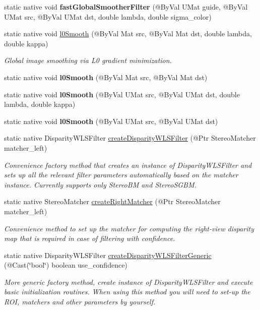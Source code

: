 \begin{DoxyCompactItemize}
static native void {\bfseries fast\+Global\+Smoother\+Filter} (@By\+Val U\+Mat guide, @By\+Val U\+Mat src, @By\+Val U\+Mat dst, double lambda, double sigma\+\_\+color)
\item 
static native void \hyperlink{group__ximgproc__filters_ga5a74b92ad3cd10d7809e4416c623610d}{l0\+Smooth} (@By\+Val Mat src, @By\+Val Mat dst, double lambda, double kappa)
\begin{DoxyCompactList}\small\item\em Global image smoothing via L0 gradient minimization. \end{DoxyCompactList}\item 
static native void {\bfseries l0\+Smooth} (@By\+Val Mat src, @By\+Val Mat dst)
\item 
static native void {\bfseries l0\+Smooth} (@By\+Val U\+Mat src, @By\+Val U\+Mat dst, double lambda, double kappa)
\item 
static native void {\bfseries l0\+Smooth} (@By\+Val U\+Mat src, @By\+Val U\+Mat dst)
\item 
static native Disparity\+W\+L\+S\+Filter \hyperlink{group__ximgproc__filters_ga5282f3f5ccb08ba470cae8c4b95cee3d}{create\+Disparity\+W\+L\+S\+Filter} (@Ptr Stereo\+Matcher matcher\+\_\+left)
\begin{DoxyCompactList}\small\item\em Convenience factory method that creates an instance of Disparity\+W\+L\+S\+Filter and sets up all the relevant filter parameters automatically based on the matcher instance. Currently supports only Stereo\+BM and Stereo\+S\+G\+BM. \end{DoxyCompactList}\item 
static native Stereo\+Matcher \hyperlink{group__ximgproc__filters_ga8d41bef5e1e848d7fa4b163459e79499}{create\+Right\+Matcher} (@Ptr Stereo\+Matcher matcher\+\_\+left)
\begin{DoxyCompactList}\small\item\em Convenience method to set up the matcher for computing the right-\/view disparity map that is required in case of filtering with confidence. \end{DoxyCompactList}\item 
static native Disparity\+W\+L\+S\+Filter \hyperlink{group__ximgproc__filters_ga4ecf158eb4378bda624a77b7afe92c9b}{create\+Disparity\+W\+L\+S\+Filter\+Generic} (@Cast(\char`\"{}bool\char`\"{}) boolean use\+\_\+confidence)
\begin{DoxyCompactList}\small\item\em More generic factory method, create instance of Disparity\+W\+L\+S\+Filter and execute basic initialization routines. When using this method you will need to set-\/up the R\+OI, matchers and other parameters by yourself. \end{DoxyCompactList}\item 

\end{DoxyCompactItemize}
